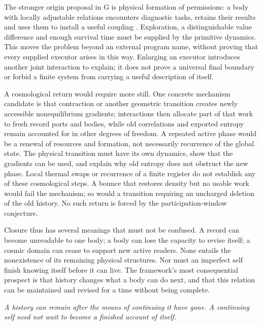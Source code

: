 \documentclass[12pt,a4paper]{article}
\begin{document}
The stronger origin proposal in G is physical formation of permissions: a body with locally adjustable relations encounters diagnostic tasks, retains their results and uses them to install a useful coupling \cite{G}. Exploration, a distinguishable value difference and enough survival time must be supplied by the primitive dynamics. This moves the problem beyond an external program name, without proving that every supplied executor arises in this way. Enlarging an executor introduces another joint interaction to explain; it does not prove a universal final boundary or forbid a finite system from carrying a useful description of itself.

A cosmological return would require more still. One concrete mechanism candidate is that contraction or another geometric transition creates newly accessible nonequilibrium gradients; interactions then allocate part of that work to fresh record ports and bodies, while old correlations and exported entropy remain accounted for in other degrees of freedom. A repeated active phase would be a renewal of resources and formation, not necessarily recurrence of the global state. The physical transition must have its own dynamics, show that the gradients can be used, and explain why old entropy does not obstruct the new phase. Local thermal swaps or recurrence of a finite register do not establish any of these cosmological steps. A bounce that restores density but no usable work would fail the mechanism; so would a transition requiring an uncharged deletion of the old history. No such return is forced by the participation-window conjecture.

Closure thus has several meanings that must not be confused. A record can become unreadable to one body; a body can lose the capacity to revise itself; a cosmic domain can cease to support new active readers. None entails the nonexistence of its remaining physical structures. Nor must an imperfect self finish knowing itself before it can live. The framework's most consequential prospect is that history changes what a body can do next, and that this relation can be maintained and revised for a time without being complete.

\bigskip
\noindent\textit{A history can remain after the means of continuing it have gone. A continuing self need not wait to become a finished account of itself.}
\end{document}
